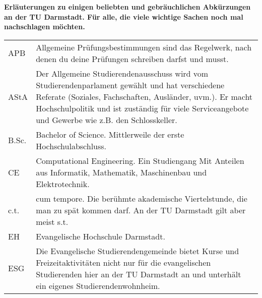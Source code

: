 
\textbf{Erläuterungen zu einigen beliebten und gebräuchlichen Abkürzungen an der TU Darmstadt. Für alle, die viele wichtige Sachen noch mal nachschlagen möchten.}

\begin{longtable}{p{20mm}p{85mm}}
    APB          & Allgemeine Prüfungsbestimmungen sind das Regelwerk, nach denen du deine Prüfungen schreiben darfst und musst.                                                                                                                                                           \\
    AStA         & Der Allgemeine Studierendenausschuss wird vom Studierendenparlament gewählt und hat verschiedene Referate (Soziales, Fachschaften, Ausländer, uvm.). Er macht Hochschulpolitik und ist zuständig für viele Serviceangebote und Gewerbe wie z.B. den Schlosskeller.      \\
    B.Sc.        & Bachelor of Science. Mittlerweile der erste Hochschulabschluss.                                                                                                                                                                                                         \\
    CE           & Computational Engineering. Ein Studiengang Mit Anteilen aus Informatik, Mathematik, Maschinenbau und Elektrotechnik.                                                                                                                                                    \\
    c.t.         & cum tempore. Die berühmte akademische Viertelstunde, die man zu spät kommen darf. An der TU Darmstadt gilt aber meist s.t.                                                                                                                                              \\
    EH           & Evangelische Hochschule Darmstadt.                                                                                                                                                                                                                                      \\
    ESG          & Die Evangelische Studierendengemeinde bietet Kurse und Freizeitaktivitäten nicht nur für die evangelischen Studierenden hier an der TU Darmstadt an und unterhält ein eigenes Studierendenwohnheim.                                                                     \\

\end{longtable}
